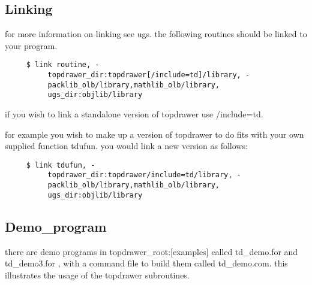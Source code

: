 \subsection{Linking}
for  more  information on linking see ugs.  the following routines should
be linked to your program.  
\begin{verbatim}
     $ link routine, - 
          topdrawer_dir:topdrawer[/include=td]/library, - 
          packlib_olb/library,mathlib_olb/library, 
          ugs_dir:objlib/library 
\end{verbatim}

if you wish to link a standalone version of topdrawer use /include=td.  

for  example  you  wish to make up a version of topdrawer to do fits with
your own supplied function tdufun.  you  would  link  a  new  version  as
follows:  
\begin{verbatim}
     $ link tdufun, - 
          topdrawer_dir:topdrawer/include=td/library, - 
          packlib_olb/library,mathlib_olb/library, 
          ugs_dir:objlib/library 
\end{verbatim}

\subsection{Demo\_program}
there  are  demo programs in topdrawer\_root:[examples] called td\_demo.for
and td\_demo3.for , with a command file to build them called  td\_demo.com.
this illustrates the usage of the topdrawer subroutines.  
